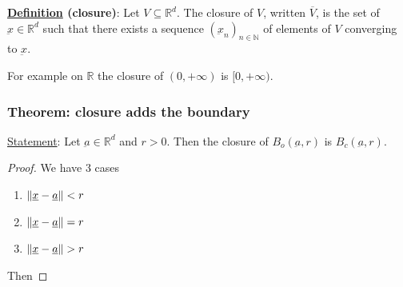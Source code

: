 \documentclass[10pt]{extarticle}
\newcommand{\R}{\mathbb{R}}
\newcommand{\N}{\mathbb{N}}
\newcommand{\munderbar}[1]{\underbar{\ensuremath{#1}}}
\begin{document}
\textbf{\underline{Definition} (closure)}:
Let $V \subseteq \R^d$. The closure of $V$, written $\overline{V}$, is the set of $\munderbar{x} \in \R^d$ such that there exists a sequence $\left(\munderbar{x}_n\right)_{n \in \N}$ of elements of $V$ converging to $\munderbar{x}$.

For example on $\R$ the closure of $(0, +\infty)$ is $[0, +\infty)$.

\subsubsection{Theorem: closure adds the boundary}

\underline{Statement}: Let $\munderbar{a} \in \R^d$ and $r > 0$.
Then the closure of $B_o(\munderbar{a}, r)$ is $B_c(\munderbar{a}, r)$.

\begin{proof}
    We have 3 cases

    \begin{enumerate}
        \item $\norm{\munderbar{x} - \munderbar{a}} < r$
        \item $\norm{\munderbar{x} - \munderbar{a}} = r$
        \item $\norm{\munderbar{x} - \munderbar{a}} > r$
    \end{enumerate}

    Then


\end{proof}
\end{document}

